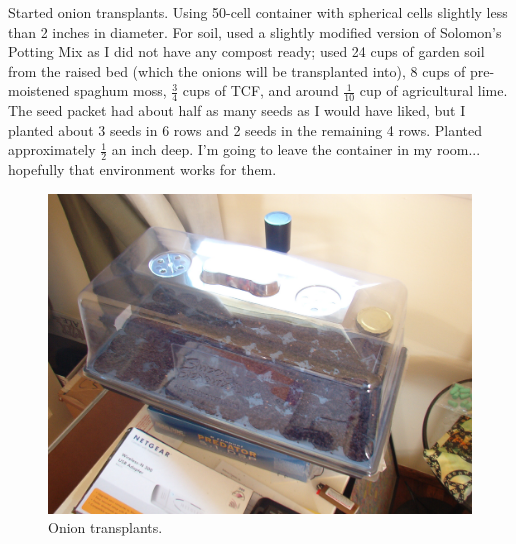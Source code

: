 \documentclass{article}
\begin{document}
Started onion transplants. Using 50-cell container with spherical cells slightly less than 2 inches in diameter. For soil, used a slightly modified version of Solomon's Potting Mix as I did not have any compost ready; used 24 cups of garden soil from the raised bed (which the onions will be transplanted into), 8 cups of pre-moistened spaghum moss, $\frac{3}{4}$ cups of TCF, and around $\frac{1}{10}$ cup of agricultural lime. The seed packet had about half as many seeds as I would have liked, but I planted about 3 seeds in 6 rows and 2 seeds in the remaining 4 rows. Planted approximately $\frac{1}{2}$ an inch deep. I'm going to leave the container in my room... hopefully that environment works for them.
\begin{figure}
\protect \includegraphics[scale=0.20]{pics/0318_onions.jpg}
\caption{Onion transplants.}
\end{figure}
\end{document}
